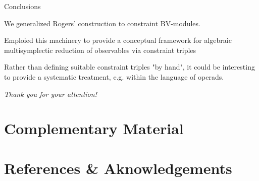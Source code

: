 \documentclass[handout,10pt]{beamer}
\begin{document}
	\addtocounter{framenumber}{-1}
		\begin{frame}{Conclusions}
			\begin{upshotblocktitle}
				We generalized Rogers' construction to constraint BV-modules.
			\end{upshotblocktitle}
			\vfill\pause

			\begin{upshotblocktitle}
				 Emploied this machinery to provide a conceptual framework for algebraic multisymplectic reduction of observables via constraint triples 
				 \smallskip

				 \nocite{Blacker-M-Ryvkin-2024}
			\end{upshotblocktitle}
			\vfill\pause

			\begin{outlookblock}
				Rather than defining suitable constraint triples "by hand", it could be interesting to provide a systematic treatment, e.g. within the language of operads.
			\end{outlookblock}
			\vfill\pause

		  	\centering 
		  	{\Huge\color{red} 
		  	\emph{Thank you for your attention!}\normalsize \color{black}}
			\vfill
 
		\end{frame}



\appendix
\section{Complementary Material}
	

\section{References \& Aknowledgements}
	
	

\end{document}
